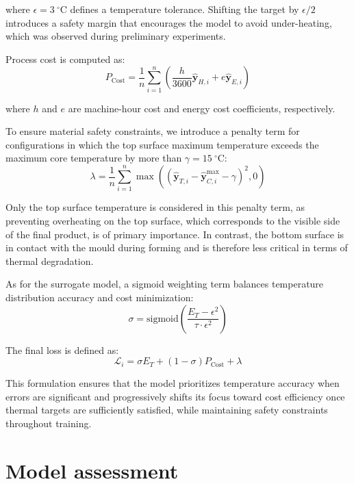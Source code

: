 \noindent where $\epsilon = 3~^\circ\mathrm{C}$ defines a temperature tolerance. Shifting the target by $\epsilon/2$ introduces a safety margin that encourages the model to avoid under-heating, which was observed during preliminary experiments.

Process cost is computed as:
\begin{equation}
	P_{\mathrm{Cost}} = \frac{1}{n} \sum_{i=1}^{n} \left( \frac{h}{3600} \mathbf{\hat{y}}_{H,i} + e \mathbf{\hat{y}}_{E,i} \right)
	\label{eq:cost}
\end{equation}

\noindent where $h$ and $e$ are machine-hour cost and energy cost coefficients, respectively.

To ensure material safety constraints, we introduce a penalty term for configurations in which the top surface maximum temperature exceeds the maximum core temperature by more than $\gamma = 15~^\circ\mathrm{C}$:
\begin{equation} 
	\lambda = \frac{1}{n} \sum_{i=1}^{n} \max\left( (\mathbf{\hat{y}}_{T,i} - \mathbf{\hat{y}}^{\max}_{C,i} - \gamma)^2, 0 \right)
	\label{eq:penalty} 
\end{equation}

Only the top surface temperature is considered in this penalty term, as preventing overheating on the top surface, which corresponds to the visible side of the final product, is of primary importance. In contrast, the bottom surface is in contact with the mould during forming and is therefore less critical in terms of thermal degradation.

As for the surrogate model, a sigmoid weighting term balances temperature distribution accuracy and cost minimization:
\begin{equation}
	\sigma = \text{sigmoid} \left( \frac{E_T - \epsilon^2}{\tau \cdot \epsilon^2} \right)
\end{equation}

The final loss is defined as:
\begin{equation}
	\mathcal{L}_i = \sigma E_T + (1 - \sigma) P_{\mathrm{Cost}} + \lambda
	\label{eq:loss_inverse}
\end{equation}

This formulation ensures that the model prioritizes temperature accuracy when errors are significant and progressively shifts its focus toward cost efficiency once thermal targets are sufficiently satisfied, while maintaining safety constraints throughout training.

\section{Model assessment}

